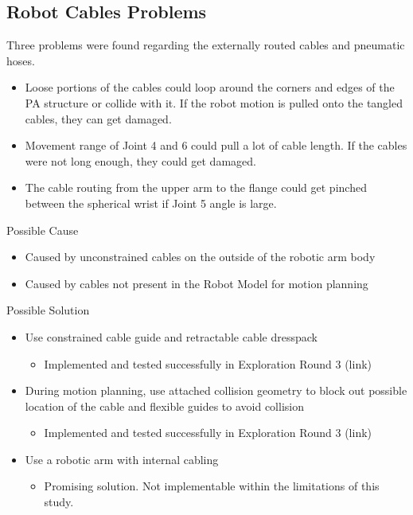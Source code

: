 \subsection{Robot Cables Problems}
\label{subsection:exploration_2_robot_cables_problems}

Three problems were found regarding the externally routed cables and pneumatic hoses. 
\begin{itemize}
    \item Loose portions of the cables could loop around the corners and edges of the PA structure or collide with it. If the robot motion is pulled onto the tangled cables, they can get damaged.
    \item Movement range of Joint 4 and 6 could pull a lot of cable length. If the cables were not long enough, they could get damaged.
    \item The cable routing from the upper arm to the flange could get pinched between the spherical wrist if Joint 5 angle is large.
\end{itemize}


Possible Cause

\begin{itemize}
    \item Caused by unconstrained cables on the outside of the robotic arm body
    \item Caused by cables not present in the Robot Model for motion planning
\end{itemize}

Possible Solution
\begin{itemize}
    \item Use constrained cable guide and retractable cable dresspack
    \begin{itemize}
        \item Implemented and tested successfully in Exploration Round 3 (link)
    \end{itemize}
    \item During motion planning, use attached collision geometry to block out possible location of the cable and flexible guides to avoid collision
    \begin{itemize}
        \item Implemented and tested successfully in Exploration Round 3 (link)
    \end{itemize}
    \item Use a robotic arm with internal cabling
    \begin{itemize}
        \item Promising solution. Not implementable within the limitations of this study.
    \end{itemize}
\end{itemize}

